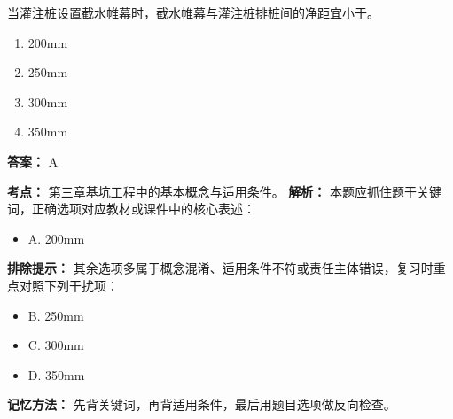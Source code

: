 \documentclass[UTF8,fontset=fandol,11pt]{ctexart}
\begin{document}
\vspace{0.2em}

\begin{quizbox}[title={第 21 题}]
当灌注桩设置截水帷幕时，截水帷幕与灌注桩排桩间的净距宜小于。\\
\begin{enumerate}[label=\Alph*.]
\item 200mm
\item 250mm
\item 300mm
\item 350mm
\end{enumerate}
\textbf{答案：} A
\vspace{0.25em}
\begin{answerbox}[title={考点解析}]
\textbf{考点：} 第三章基坑工程中的基本概念与适用条件。
\textbf{解析：} 本题应抓住题干关键词，正确选项对应教材或课件中的核心表述：
\begin{itemize}
\item A. 200mm
\end{itemize}
\textbf{排除提示：} 其余选项多属于概念混淆、适用条件不符或责任主体错误，复习时重点对照下列干扰项：
\begin{itemize}
\item B. 250mm
\item C. 300mm
\item D. 350mm
\end{itemize}
\textbf{记忆方法：} 先背关键词，再背适用条件，最后用题目选项做反向检查。
\end{answerbox}
\end{quizbox}

\vspace{0.2em}
\end{document}
